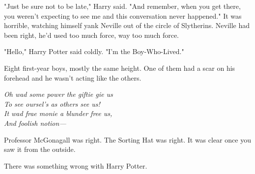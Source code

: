 "Just be sure not to be late," Harry said. "And remember, when you get there, you weren't expecting to see me and this conversation never happened."
\sbreak
It was horrible, watching himself yank Neville out of the circle of Slytherins. Neville had been right, he'd used too much force, way too much force.

"Hello," Harry Potter said coldly. "I'm the Boy-Who-Lived."

Eight first-year boys, mostly the same height. One of them had a scar on his forehead and he wasn't acting like the others.

\emph{Oh wad some power the giftie gie us\\
To see oursel's as others see us!\\
It wad frae monie a blunder free us,\\
And foolish notion---}

Professor McGonagall was right. The Sorting Hat was right. It was clear once you saw it from the outside.

There was something wrong with Harry Potter.